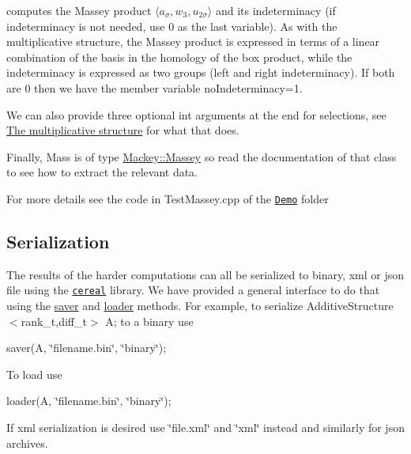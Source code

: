 computes the Massey product $\langle a_{\sigma},w_3,u_{2\sigma}\rangle $ and its indeterminacy (if indeterminacy is not needed, use $0$ as the last variable). As with the multiplicative structure, the Massey product is expressed in terms of a linear combination of the basis in the homology of the box product, while the indeterminacy is expressed as two groups (left and right indeterminacy). If both are $0$ then we have the member variable {\ttfamily no\+Indeterminacy=1}.

We can also provide three optional {\ttfamily int} arguments at the end for selections, see \hyperlink{use_step1mult}{The multiplicative structure} for what that does.

Finally, {\ttfamily Mass} is of type {\ttfamily \hyperlink{classMackey_1_1Massey}{Mackey\+::\+Massey}} so read the documentation of that class to see how to extract the relevant data.

For more details see the code in Test\+Massey.\+cpp of the \href{https://github.com/NickG-Math/Mackey/tree/master/Demo}{\tt Demo} folder\hypertarget{use_step1Cer}{}\subsection{Serialization}\label{use_step1Cer}
The results of the harder computations can all be serialized to binary, xml or json file using the \href{https://uscilab.github.io/cereal}{\tt cereal} library. We have provided a general interface to do that using the \hyperlink{namespaceMackey_a1824d780ce15f1845e4f87bf056feec9}{saver} and \hyperlink{namespaceMackey_a735958355cdca12e0d312b7e604f28bc}{loader} methods. For example, to serialize {\ttfamily Additive\+Structure$<$rank\+\_\+t,diff\+\_\+t$>$ A;} to a binary use

{\ttfamily saver(A, \char`\"{}filename.\+bin\char`\"{}, \char`\"{}binary\char`\"{});}

To load use

{\ttfamily loader(A, \char`\"{}filename.\+bin\char`\"{}, \char`\"{}binary\char`\"{});}

If {\ttfamily xml} serialization is desired use \char`\"{}file.\+xml\char`\"{} and \char`\"{}xml\char`\"{} instead and similarly for json archives. 